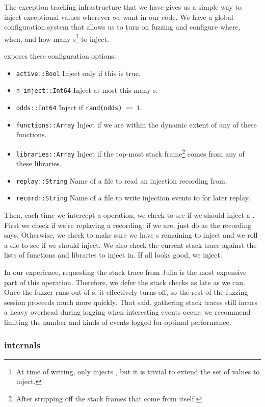 \documentclass{juliacon}
\begin{document}
The exception tracking infrastructure that we have gives us a simple way to inject exceptional values wherever we want in our code.
We have a global configuration system that allows us to turn on fuzzing and configure where, when, and how many \NaN{}s\footnote{At time of writing, \FT{} only injects \NaN{}, but it is trivial to extend the set of values to inject.} to inject.

\FT{} exposes these configuration options:

\begin{itemize}
\item \texttt{active::Bool} Inject only if this is true.
\item \texttt{n\_inject::Int64} Inject at most this many \NaN{}s.
\item \texttt{odds::Int64} Inject if \texttt{rand(odds) == 1}.
\item \texttt{functions::Array} Inject if we are within the dynamic extent of any of these functions.
\item \texttt{libraries::Array} Inject if the top-most stack frame\footnote{After stripping off the stack frames that come from \FT{} itself.} comes from any of these libraries.
\item \texttt{replay::String} Name of a file to read an injection recording from.
\item \texttt{record::String} Name of a file to write injection events to for later replay.
\end{itemize}

Then, each time we intercept a \fp{} operation, we check to see if we should inject a \NaN{}. First we check if we're replaying a recording: if we are, just do as the recording says. Otherwise, we check to make sure we have \NaN{}s remaining to inject and we roll a die to see if we should inject. We also check the current stack trace against the lists of functions and libraries to inject in. If all looks good, we inject.

In our experience, requesting the stack trace from Julia is the most expensive part of this operation.
Therefore, we defer the stack checks as late as we can.
Once the fuzzer runs out of \NaN{}s, it effectively turns off, so the rest of the fuzzing session proceeds much more quickly.
That said, gathering stack traces still incurs a heavy overhead during logging when interesting events occur;
we recommend limiting the number and kinds of events logged for optimal performance.

\subsubsection{\FT{} internals}
\end{document}
